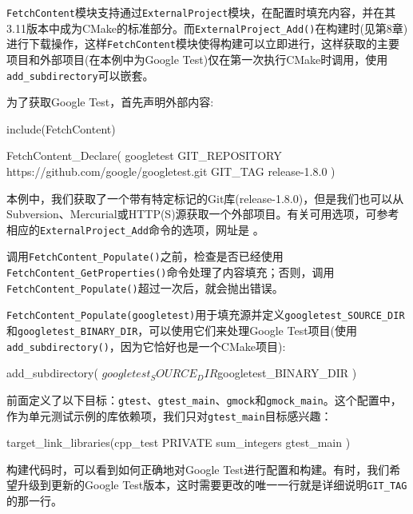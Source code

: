 
\texttt{FetchContent}模块支持通过\texttt{ExternalProject}模块，在配置时填充内容，并在其3.11版本中成为CMake的标准部分。而\texttt{ExternalProject\_Add()}在构建时(见第8章)进行下载操作，这样\texttt{FetchContent}模块使得构建可以立即进行，这样获取的主要项目和外部项目(在本例中为Google Test)仅在第一次执行CMake时调用，使用\texttt{add\_subdirectory}可以嵌套。

为了获取Google Test，首先声明外部内容:

\begin{codebox}[cmake]
include(FetchContent)

FetchContent_Declare(
    googletest
  GIT_REPOSITORY https://github.com/google/googletest.git
  GIT_TAG release-1.8.0
)
\end{codebox}

本例中，我们获取了一个带有特定标记的Git库(release-1.8.0)，但是我们也可以从Subversion、Mercurial或HTTP(S)源获取一个外部项目。有关可用选项，可参考相应的\texttt{ExternalProject\_Add}命令的选项，网址是 。

调用\texttt{FetchContent\_Populate()}之前，检查是否已经使用\texttt{FetchContent\_GetProperties()}命令处理了内容填充；否则，调用\texttt{FetchContent\_Populate()}超过一次后，就会抛出错误。

\texttt{FetchContent\_Populate(googletest)}用于填充源并定义\texttt{googletest\_SOURCE\_DIR}和\texttt{googletest\_BINARY\_DIR}，可以使用它们来处理Google Test项目(使用\texttt{add\_subdirectory()}，因为它恰好也是一个CMake项目):

\begin{codebox}[cmake]
add_subdirectory(
  ${googletest_SOURCE_DIR}
  ${googletest_BINARY_DIR}
  )
\end{codebox}

前面定义了以下目标：\texttt{gtest}、\texttt{gtest\_main}、\texttt{gmock}和\texttt{gmock\_main}。这个配置中，作为单元测试示例的库依赖项，我们只对\texttt{gtest\_main}目标感兴趣：

\begin{codebox}[cmake]
target_link_libraries(cpp_test
  PRIVATE
    sum_integers
    gtest_main
)
\end{codebox}

构建代码时，可以看到如何正确地对Google Test进行配置和构建。有时，我们希望升级到更新的Google Test版本，这时需要更改的唯一一行就是详细说明\texttt{GIT\_TAG}的那一行。


